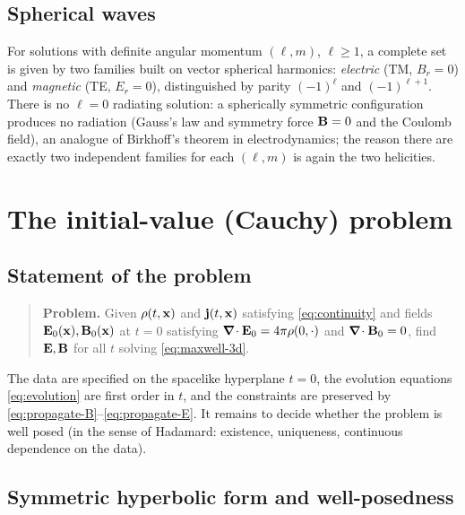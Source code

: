 \subsection{Spherical waves}

For solutions with definite angular momentum $(\ell,m)$, $\ell\ge1$, a
complete set is given by two families built on vector spherical
harmonics: \emph{electric} (TM, $B_r=0$) and \emph{magnetic} (TE, $E_r=0$),
distinguished by parity $(-1)^{\ell}$ and $(-1)^{\ell+1}$.  There is no
$\ell=0$ radiating solution: a spherically symmetric configuration
produces no radiation (Gauss's law and symmetry force $\mathbf{B}=0$ and the
Coulomb field), an analogue of Birkhoff's theorem in
electrodynamics; the reason there are exactly two independent families
for each $(\ell,m)$ is again the two helicities.

\section{The initial-value (Cauchy) problem}\label{sec:mx-cauchy}

\subsection{Statement of the problem}

\begin{quote}
\textbf{Problem.}  Given $\rho(t,\mathbf{x})$ and $\mathbf{j}(t,\mathbf{x})$ satisfying
\eqref{eq:continuity} and fields $\mathbf{E}_0(\mathbf{x}),\mathbf{B}_0(\mathbf{x})$ at $t=0$
satisfying $\boldsymbol{\nabla}\!\cdot\mathbf{E}_0=4\pi\rho(0,\cdot)$ and $\boldsymbol{\nabla}\!\cdot\mathbf{B}_0=0$, find $\mathbf{E},\mathbf{B}$ for all
$t$ solving \eqref{eq:maxwell-3d}.
\end{quote}
The data are specified on the spacelike hyperplane $t=0$, the evolution
equations \eqref{eq:evolution} are first order in $t$, and the
constraints are preserved by \eqref{eq:propagate-B}--\eqref{eq:propagate-E}.  It remains to decide whether the
problem is well posed (in the sense of Hadamard: existence, uniqueness,
continuous dependence on the data).

\subsection{Symmetric hyperbolic form and well-posedness}

